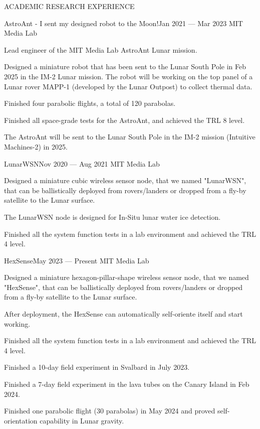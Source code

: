 \documentclass{resume} %
\begin{document}
\begin{rSection}{ACADEMIC RESEARCH EXPERIENCE}
\begin{rSubsection}{AstroAnt - I sent my designed robot to the Moon!}{Jan 2021 --- Mar 2023}{ }{MIT Media Lab}
    \item Lead engineer of the MIT Media Lab AstroAnt Lunar mission.
    \item Designed a miniature robot that has been sent to the Lunar South Pole in Feb 2025 in the IM-2 Lunar mission.
          The robot will be working on the top panel of a Lunar rover MAPP-1 (developed by the Lunar Outpost)
          to collect thermal data.
    \item Finished four parabolic flights, a total of 120 parabolas.
    \item Finished all space-grade tests for the AstroAnt, and achieved the TRL 8 level.
    \item The AstroAnt will be sent to the Lunar South Pole in the IM-2 mission (Intuitive Machines-2) in 2025.
\end{rSubsection}

\begin{rSubsection}{LunarWSN}{Nov 2020 --- Aug 2021}{ }{MIT Media Lab}
\item Designed a miniature cubic wireless sensor node, that we named "LunarWSN",
      that can be ballistically deployed from rovers/landers or dropped from a fly-by satellite to the Lunar surface.
\item The LunarWSN node is designed for In-Situ lunar water ice detection.
\item Finished all the system function tests in a lab environment and achieved the TRL 4 level.
\end{rSubsection}

\newpage

\begin{rSubsection}{HexSense}{May 2023 --- Present}{ }{MIT Media Lab}
\item Designed a miniature hexagon-pillar-shape wireless sensor node, that we named "HexSense",
      that can be ballistically deployed from rovers/landers or dropped from a fly-by satellite to the Lunar surface.
\item After deployment, the HexSense can automatically self-oriente itself and start working.
\item Finished all the system function tests in a lab environment and achieved the TRL 4 level.
\item Finished a 10-day field experiment in Svalbard in July 2023.
\item Finished a 7-day field experiment in the lava tubes on the Canary Island in Feb 2024.
\item Finished one parabolic flight (30 parabolas) in May 2024 and proved self-orientation capability in Lunar gravity.
\end{rSubsection}


\end{rSection}
\end{document}
